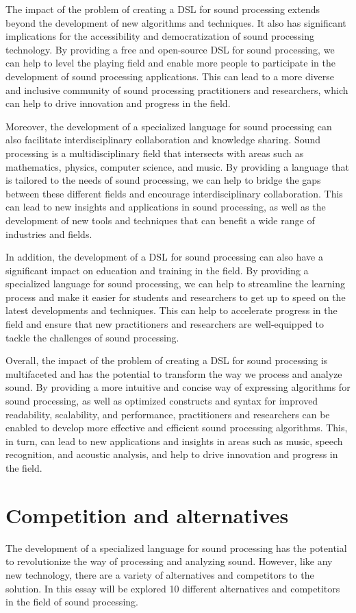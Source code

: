 The impact of the problem of creating a DSL for sound processing extends beyond the development of new algorithms and techniques. It also has significant implications for the accessibility and democratization of sound processing technology. By providing a free and open-source DSL for sound processing, we can help to level the playing field and enable more people to participate in the development of sound processing applications. This can lead to a more diverse and inclusive community of sound processing practitioners and researchers, which can help to drive innovation and progress in the field.

Moreover, the development of a specialized language for sound processing can also facilitate interdisciplinary collaboration and knowledge sharing. Sound processing is a multidisciplinary field that intersects with areas such as mathematics, physics, computer science, and music. By providing a language that is tailored to the needs of sound processing, we can help to bridge the gaps between these different fields and encourage interdisciplinary collaboration. This can lead to new insights and applications in sound processing, as well as the development of new tools and techniques that can benefit a wide range of industries and fields.

In addition, the development of a DSL for sound processing can also have a significant impact on education and training in the field. By providing a specialized language for sound processing, we can help to streamline the learning process and make it easier for students and researchers to get up to speed on the latest developments and techniques. This can help to accelerate progress in the field and ensure that new practitioners and researchers are well-equipped to tackle the challenges of sound processing.

Overall, the impact of the problem of creating a DSL for sound processing is multifaceted and has the potential to transform the way we process and analyze sound. By providing a more intuitive and concise way of expressing algorithms for sound processing, as well as optimized constructs and syntax for improved readability, scalability, and performance, practitioners and researchers can be enabled to develop more effective and efficient sound processing algorithms. This, in turn, can lead to new applications and insights in areas such as music, speech recognition, and acoustic analysis, and help to drive innovation and progress in the field.

\section{Competition and alternatives } 
The development of a specialized language for sound processing has the potential to revolutionize the way of processing and analyzing sound. However, like any new technology, there are a variety of alternatives and competitors to the solution. In this essay will be explored 10 different alternatives and competitors in the field of sound processing.


